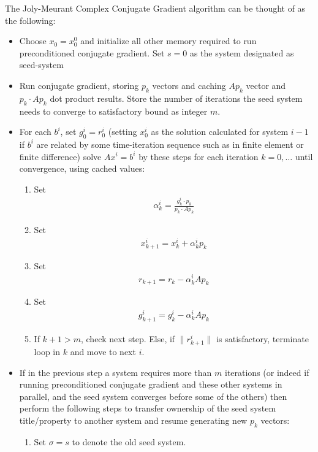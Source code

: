 \documentclass[11pt]{article}
\begin{document}
The Joly-Meurant Complex Conjugate Gradient algorithm can be thought of as the following: \begin{itemize}
\item Choose $x_0 = x_0^0$ and initialize all other memory required to run preconditioned conjugate gradient. Set $s = 0$ as the system designated as seed-system
\item Run conjugate gradient, storing $p_k$ vectors and caching $A p_k$ vector and $p_k \cdot A p_k$ dot product results. Store the number of iterations the seed system needs to converge to satisfactory bound as integer $m$.
\item For each $b^i$, set $g_0^i = r_0^i$ (setting $x_0^i$ as the solution calculated for system $i-1$ if $b^i$ are related by some time-iteration sequence such as in finite element or finite difference) solve $Ax^i = b^i$ by these steps for each iteration $k=0,\dots $ until convergence, using cached values: \begin{enumerate}
\item Set \begin{gather*}
\alpha_k^i = \frac{g_k^i \cdot p_k }{p_k \cdot A p_k}
\end{gather*}
\item Set \begin{gather*}
x_{k+1}^i = x_k^i + \alpha_k^i p_k
\end{gather*}
\item Set \begin{gather*}
r_{k+1} = r_k - \alpha_k^i A p_k
\end{gather*}
\item Set \begin{gather*}
g_{k+1}^i = g_k^i - \alpha_k^i A p_k 
\end{gather*}
\item If $k+1 > m$, check next step. Else, if $\lVert r_{k+1}^i \rVert$ is satisfactory, terminate loop in $k$ and move to next $i$.
\end{enumerate} 
\item If in the previous step a system requires more than $m$ iterations (or indeed if running preconditioned conjugate gradient and these other systems in parallel, and the seed system converges before some of the others) then perform the following steps to transfer ownership of the seed system title/property to another system and resume generating new $p_k$ vectors: \begin{enumerate}
\item Set $\sigma = s$ to denote the old seed system.

\end{enumerate}
\end{itemize}
\end{document}
